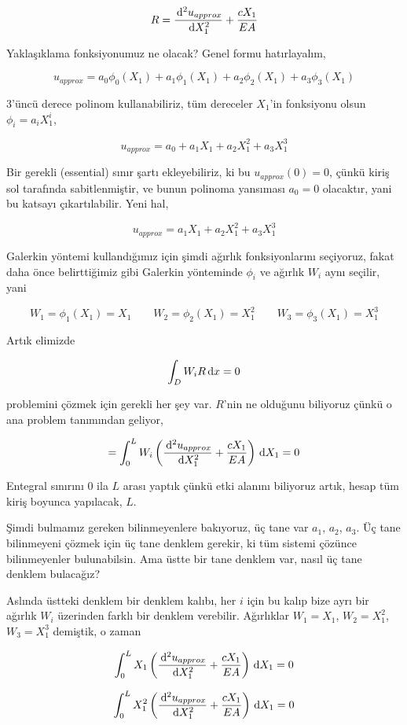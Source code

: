 \documentclass[12pt,fleqn]{article}\usepackage{../../common}
\begin{document}
$$
R = \frac{\,\mathrm{d}^2 u_{approx}}{\,\mathrm{d} X_1^2} + \frac{c X_1}{EA}
$$

Yaklaşıklama fonksiyonumuz ne olacak? Genel formu hatırlayalım,

$$
u_{approx} = a_0 \phi_0(X_1) + a_1 \phi_1(X_1) + a_2 \phi_2(X_1) + a_3 \phi_3(X_1) 
$$

3'üncü derece polinom kullanabiliriz, tüm dereceler $X_1$'in fonksiyonu olsun
$\phi_i = a_i X_1^i$, 

$$
u_{approx} = a_0 + a_1 X_1 + a_2 X_1^2 + a_3 X_1^3 
$$

Bir gerekli (essential) sınır şartı ekleyebiliriz, ki bu $u_{approx}(0)=0$,
çünkü kiriş sol tarafında sabitlenmiştir, ve bunun polinoma yansıması
$a_0=0$ olacaktır, yani bu katsayı çıkartılabilir. Yeni hal,

$$
u_{approx} = a_1 X_1 + a_2 X_1^2 + a_3 X_1^3 
$$

Galerkin yöntemi kullandığımız için şimdi ağırlık fonksiyonlarını seçiyoruz,
fakat daha önce belirttiğimiz gibi Galerkin yönteminde $\phi_i$ ve ağırlık $W_i$
aynı seçilir, yani

$$
W_1 = \phi_1(X_1) = X_1 \qquad 
W_2 = \phi_2(X_1) = X_1^2 \qquad 
W_3 = \phi_3(X_1) = X_1^3
$$

Artık elimizde 

$$
\int_D W_i R \,\mathrm{d} x = 0
$$

problemini çözmek için gerekli her şey var. $R$'nin ne olduğunu biliyoruz
çünkü o ana problem tanımından geliyor,

$$
= \int_{0}^{L} W_i
\left(
 \frac{\,\mathrm{d}^2 u_{approx}}{\,\mathrm{d} X_1^2} + \frac{c X_1}{EA}
\right) \,\mathrm{d} X_1 = 0
$$

Entegral sınırını 0 ila $L$ arası yaptık çünkü etki alanını biliyoruz artık,
hesap tüm kiriş boyunca yapılacak, $L$.

Şimdi bulmamız gereken bilinmeyenlere bakıyoruz, üç tane var $a_1$, $a_2$,
$a_3$. Üç tane bilinmeyeni çözmek için üç tane denklem gerekir, ki tüm sistemi
çözünce bilinmeyenler bulunabilsin. Ama üstte bir tane denklem var, nasıl
üç tane denklem bulacağız?

Aslında üstteki denklem bir denklem kalıbı, her $i$ için bu kalıp bize ayrı bir
ağırlık $W_i$ üzerinden farklı bir denklem verebilir. Ağırlıklar $W_1 = X_1$,
$W_2 = X_1^2$, $W_3 = X_1^3$ demiştik, o zaman 

$$
\int_{0}^{L} X_1 \left( \frac{\,\mathrm{d}^2 u_{approx}}{\,\mathrm{d} X_1^2} + \frac{c X_1}{EA}  \right) \,\mathrm{d} X_1 = 0
$$

$$
\int_{0}^{L} X_1^2 \left( \frac{\,\mathrm{d}^2 u_{approx}}{\,\mathrm{d} X_1^2} + \frac{c X_1}{EA}  \right) \,\mathrm{d} X_1 = 0
$$
\end{document}
